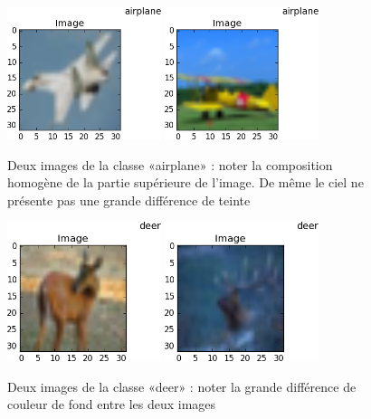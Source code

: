 \begin{figure}[H]
\begin{center}
\includegraphics[width=0.4\textwidth]{images/avion_1.png}
\includegraphics[width=0.4\textwidth]{images/avion_2.png}
\caption{Deux images de la classe «airplane» : noter la composition homogène de la partie supérieure de l'image. De même le ciel ne présente pas une grande différence de teinte}
\end{center}
\end{figure}


\begin{figure}[H]
\begin{center}
\includegraphics[width=0.4\textwidth]{images/deer_1.png}
\includegraphics[width=0.4\textwidth]{images/deer_2.png}
\caption{Deux images de la classe «deer» : noter la grande différence de couleur de fond entre les deux images}
\end{center}
\end{figure}

